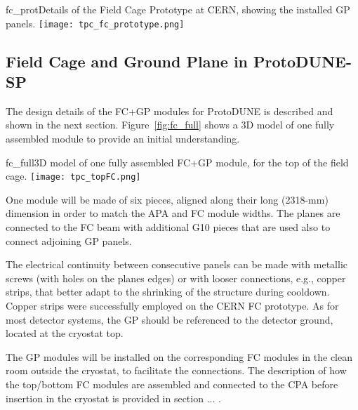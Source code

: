 \begin{cdrfigure}{fc_prot}{Details of the Field Cage Prototype at CERN, showing the installed GP panels.}
\texttt{[image: tpc\_fc\_prototype.png]}
\end{cdrfigure}

\subsection{Field Cage and Ground Plane in ProtoDUNE-SP}

The design details of the FC+GP modules for ProtoDUNE is described and shown in the next section.  Figure~\ref{fig:fc_full} shows a 3D model of one fully assembled module to provide an initial understanding.

\begin{cdrfigure}{fc_full}{3D model of one fully assembled FC+GP module, for the top of the field cage. }
\texttt{[image: tpc\_topFC.png]}
\end{cdrfigure}

One module will be made of six pieces, aligned %
along their long (2318-mm) dimension %
 in order to match the APA and FC module widths. The planes are connected to the FC beam with additional %
G10 pieces that are used also to connect adjoining %
GP panels. 

The electrical continuity between consecutive panels can be made %
with metallic screws (with holes on the planes edges) or with looser connections, e.g., copper strips, that better adapt to the shrinking of the structure during cooldown. Copper strips were successfully employed on the CERN FC prototype.
As for most detector systems, the GP should be referenced to the detector ground, located %
at the cryostat top.

The GP modules will be installed on the corresponding FC modules in the clean room outside the cryostat, to facilitate the connections. The description of how the top/bottom FC modules are assembled and connected to the CPA before insertion in the cryostat is provided in section ... .


